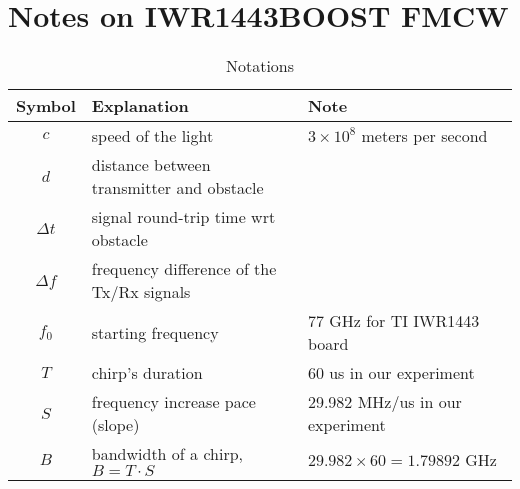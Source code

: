 \documentclass[11pt, oneside]{article}   	%
\begin{document}
\section{Notes on IWR1443BOOST FMCW}

\begin{table}[t]
\centering
\caption{Notations}
\label{tab:notation}
\vspace{4pt}
\begin{tabular}{c|l|l}
\hline
\textbf{Symbol} & \textbf{Explanation} & \textbf{\centering Note} \\
\hline
\hline
$c$ & speed of the light & $3\times 10^8$ meters per second\\
\hline
$d$ & distance between transmitter and obstacle & \\
\hline
$\Delta t$ &signal round-trip time wrt obstacle & \\
\hline
$\Delta f$ & frequency difference of the Tx/Rx signals & \\
\hline
$f_0$ & starting frequency & 77 GHz for TI IWR1443 board \\
\hline
$T$ & chirp's duration & 60 us in our experiment \\
\hline
$S$ & frequency increase pace (slope) & 29.982 MHz/us in our experiment\\
\hline
$B$ & bandwidth of a chirp, $B=T\cdot S$ & $29.982 \times 60 = 1.79892$ GHz \\
\hline
\end{tabular}
\end{table}
\end{document}
